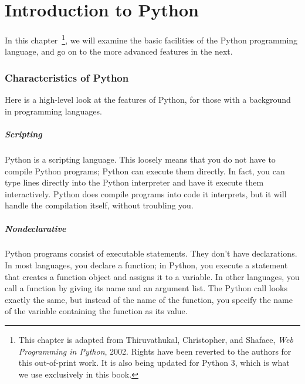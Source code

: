 \chapter{Introduction to Python}

\def\tightlist{}

In this chapter~\footnote{This chapter is adapted from Thiruvathukal, Christopher, and Shafaee, \emph{Web Programming in Python}, 2002. Rights have been reverted to the authors for this out-of-print work. It is also being updated for Python 3, which is what we use exclusively in this book.}, we will
examine the basic facilities of the Python programming language, and go
on to the more advanced features in the next.

\subsection{Characteristics of Python}
\label{characteristics-of-python}

Here is a high-level look at the
features of Python, for those with a background in programming
languages.

\paragraph{Scripting} 
Python is a scripting language.
This loosely means that you do not have to compile Python programs;
Python can execute them directly. In fact, you can type lines directly
into the Python interpreter and have it execute them interactively.
Python does compile programs into code it interprets, but it will handle
the compilation itself, without troubling you.

\paragraph{Nondeclarative}
Python programs consist of
executable statements. They don't have declarations. In most languages,
you declare a function; in Python, you execute a statement that creates
a function object and assigns it to a variable. In other languages, you
call a function by giving its name and an argument list. The Python call
looks exactly the same, but instead of the name of the function, you
specify the name of the variable containing the function as its value.

